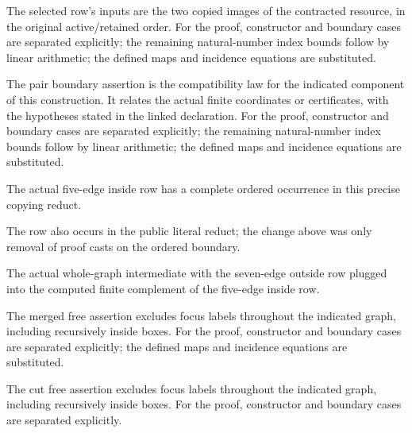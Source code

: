 The selected row's inputs are the two copied images of the contracted resource, in the original active/retained order.
For the proof, constructor and boundary cases are separated explicitly; the remaining natural-number index bounds follow by linear arithmetic; the defined maps and incidence equations are substituted.
\par{}

The pair boundary assertion is the compatibility law for the indicated component of this construction. It relates the actual finite coordinates or certificates, with the hypotheses stated in the linked declaration.
For the proof, constructor and boundary cases are separated explicitly; the remaining natural-number index bounds follow by linear arithmetic; the defined maps and incidence equations are substituted.
\par{}

The actual five-edge inside row has a complete ordered occurrence in this precise copying reduct.
\par{}

The row also occurs in the public literal reduct; the change above was only removal of proof casts on the ordered boundary.
\par{}

The actual whole-graph intermediate with the seven-edge outside row plugged into the computed finite complement of the five-edge inside row.
\par{}

The merged free assertion excludes focus labels throughout the indicated graph, including recursively inside boxes.
For the proof, constructor and boundary cases are separated explicitly; the defined maps and incidence equations are substituted.
\par{}

The cut free assertion excludes focus labels throughout the indicated graph, including recursively inside boxes.
For the proof, constructor and boundary cases are separated explicitly.
\par{}

